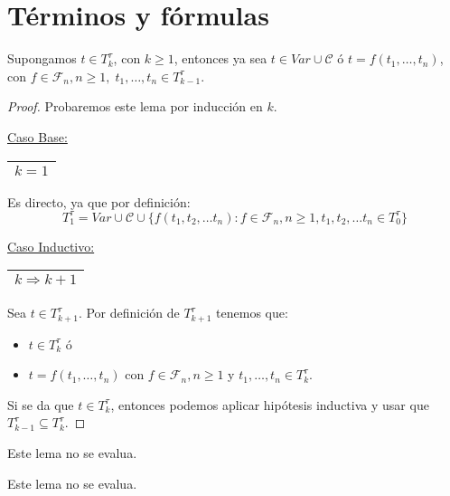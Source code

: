 \section{Términos y fórmulas}

  \begin{lemma} \label{lemma_29}
    \PN Supongamos $t \in T_{k}^{\tau}$, con $k \geq 1$, entonces ya sea $t \in Var \cup \mathcal{C}$ ó $t = f(t_{1},
    \dotsc, t_{n})$, con $f \in \mathcal{F}_{n}, n \geq 1, \; t_{1}, \dotsc, t_{n} \in T_{k-1}^{\tau}$.
  \end{lemma}
  \begin{proof}
    \PN Probaremos este lema por inducción en $k$.

    \vspace{3mm}
    \PN \underline{Caso Base:} \begin{tabular}{|c|} \hline $k = 1$ \\\hline \end{tabular} Es directo, ya que por
    definición:
    \[
      T_{1}^{\tau} = Var \cup \mathcal{C} \cup \{f(t_{1}, t_{2}, \dotsc t_{n}): f \in \mathcal{F}_n, n \geq 1, t_{1},
      t_{2}, \dotsc t_{n} \in T_{0}^{\tau}\}
    \]

		\PN \underline{Caso Inductivo:} \begin{tabular}{|c|} \hline $k \Rightarrow k + 1$ \\\hline \end{tabular} Sea $t \in
    T_{k+1}^{\tau}$. Por definición de $ T_{k+1}^{\tau}$ tenemos que:
    \begin{itemize}
      \item $t \in T_{k}^{\tau}$ ó
      \item $t = f(t_{1}, \dotsc, t_{n})$ con $f \in \mathcal{F}_{n}, n \geq 1$ y $t_{1}, \dotsc, t_{n}\in T_{k}^{\tau}$.
    \end{itemize}

    \PN Si se da que $t \in T_{k}^{\tau}$, entonces podemos aplicar hipótesis inductiva y usar que $T_{k-1}^{\tau}
    \subseteq T_{k}^{\tau}$.
  \end{proof}

  \begin{lemma}
    \PN Este lema no se evalua.
  \end{lemma}

  \begin{lemma}
    \PN Este lema no se evalua.
  \end{lemma}

